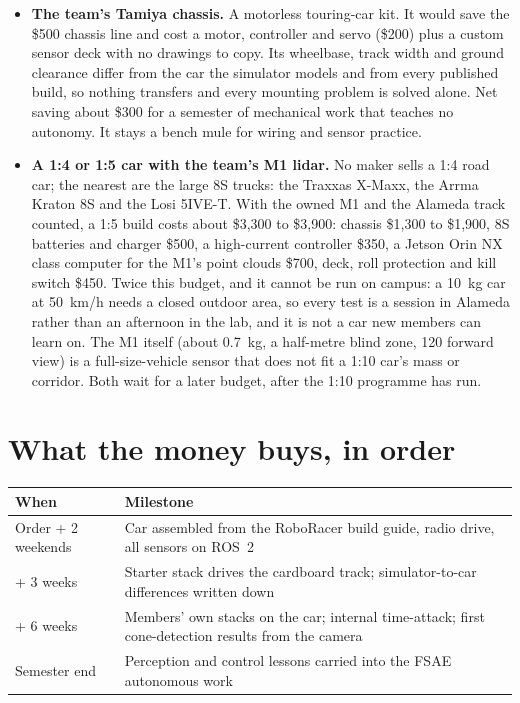 \documentclass[11pt,a4paper]{article}
\begin{document}
\begin{itemize}
  \item \textbf{The team's Tamiya chassis.} A motorless touring-car kit. It would save the
  \$500 chassis line and cost a motor, controller and servo (\$200) plus a custom sensor deck
  with no drawings to copy. Its wheelbase, track width and ground clearance differ from the
  car the simulator models and from every published build, so nothing transfers and every
  mounting problem is solved alone. Net saving about \$300 for a semester of mechanical work
  that teaches no autonomy. It stays a bench mule for wiring and sensor practice.
  \item \textbf{A 1:4 or 1:5 car with the team's M1 lidar.} No maker sells a 1:4 road car;
  the nearest are the large 8S trucks: the Traxxas X-Maxx, the Arrma Kraton 8S and the Losi
  5IVE-T. With the owned M1 and the Alameda track counted, a 1:5 build
  costs about \$3{,}300 to \$3{,}900: chassis \$1{,}300 to \$1{,}900, 8S batteries and
  charger \$500, a high-current controller \$350, a Jetson Orin NX class computer for the
  M1's point clouds \$700, deck, roll protection and kill switch \$450. Twice this budget,
  and it cannot be run on campus: a 10~kg car at 50~km/h needs a closed outdoor area, so
  every test is a session in Alameda rather than an afternoon in the lab, and it is not a
  car new members can learn on. The M1 itself (about 0.7~kg, a half-metre blind zone,
  120\textdegree{} forward view) is a full-size-vehicle sensor that does not fit a 1:10 car's
  mass or corridor. Both wait for a later budget, after the 1:10 programme has run.
\end{itemize}

\section{What the money buys, in order}

\begin{tabularx}{\linewidth}{lX}
\toprule
When & Milestone \\
\midrule
Order + 2 weekends & Car assembled from the RoboRacer build guide, radio drive, all sensors on ROS~2 \\
+ 3 weeks & Starter stack drives the cardboard track; simulator-to-car differences written down \\
+ 6 weeks & Members' own stacks on the car; internal time-attack; first cone-detection results from the camera \\
Semester end & Perception and control lessons carried into the FSAE autonomous work \\
\bottomrule
\end{tabularx}
\end{document}
